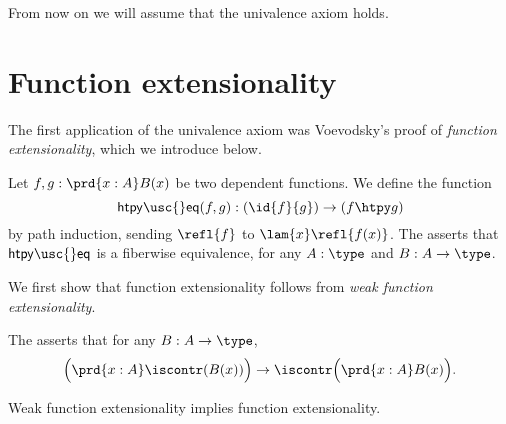 From now on we will assume that the univalence axiom holds.

\section{Function extensionality}

The first application of the univalence axiom was Voevodsky's proof of \emph{function extensionality}, which we introduce below.

\begin{defn}
Let $f,g:\prd{x:A}B(x)$ be two dependent functions. We define the function
\begin{equation*}
\mathsf{htpy\usc{}eq}(f,g) : (\id{f}{g})\to (f\htpy g)
\end{equation*}
by path induction, sending $\refl{f}$ to $\lam{x}\refl{f(x)}$. The  asserts that $\mathsf{htpy\usc{}eq}$ is a fiberwise equivalence, for any $A:\type$ and $B:A\to\type$.
\end{defn}

We first show that function extensionality follows from \emph{weak function extensionality}.

\begin{defn}
The  asserts that for any $B:A\to\type$,
\begin{equation*}
\Big(\prd{x:A}\iscontr(B(x))\Big)\to \iscontr\Big(\prd{x:A}B(x)\Big).
\end{equation*}
\end{defn}

\begin{thm}
Weak function extensionality implies function extensionality.
\end{thm}

